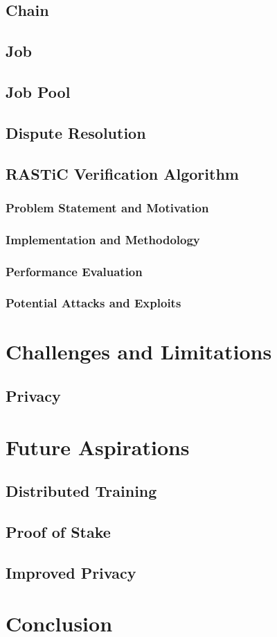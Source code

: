 \documentclass{article}
\begin{document}
\subsection{Chain}

\subsection{Job}
\subsection{Job Pool}
\subsection{Dispute Resolution}

\subsection{RASTiC Verification Algorithm}
\subsubsection{Problem Statement and Motivation}
\subsubsection{Implementation and Methodology}
\subsubsection{Performance Evaluation}
\subsubsection{Potential Attacks and Exploits}

\section{Challenges and Limitations}
\subsection{Privacy}

\section {Future Aspirations}
\subsection{Distributed Training}
\subsection{Proof of Stake}
\subsection{Improved Privacy}    

\section {Conclusion}
\end{document}
